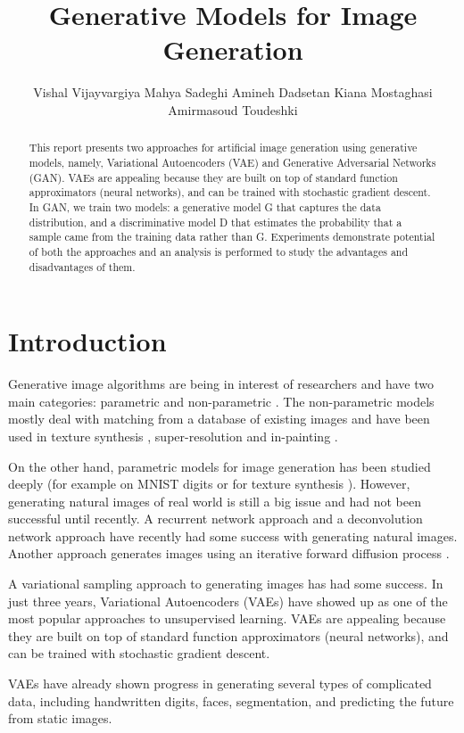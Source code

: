 \documentclass{article} %
\title{Generative Models for Image Generation}
\author{
Vishal Vijayvargiya
Mahya Sadeghi
Amineh Dadsetan
Kiana Mostaghasi
Amirmasoud Toudeshki
}
\begin{document}
\maketitle

\begin{abstract}
    This report presents two approaches for artificial image generation using generative models, namely, Variational Autoencoders (VAE) and Generative Adversarial Networks (GAN). VAEs are appealing because they are built on top of standard function approximators (neural networks), and can be trained with stochastic gradient descent. In GAN, we train two models: a generative model G that captures the data distribution, and a discriminative model D that estimates the probability that a sample came from the training data rather than G. Experiments demonstrate potential of both the approaches and an analysis is performed to study the advantages and disadvantages of them.
\end{abstract}
\section{Introduction}
Generative image algorithms are being in interest of researchers and have two main categories: parametric and non-parametric \cite{yek}. The non-parametric models mostly deal with matching from a database of existing images and have been used in texture synthesis \cite{do}, super-resolution  \cite{seh} and in-painting \cite{chahar}.

On the other hand, parametric models for image generation has been studied deeply (for example on MNIST digits or for texture synthesis \cite{panj}). However, generating natural images of real world  is still a big issue and had not been successful until recently. 
A recurrent network approach \cite{shish} and a deconvolution network approach \cite{haft}  have recently had some success with generating natural images. Another approach generates images using an iterative forward diffusion process \cite{hasht}.

A variational sampling approach to generating images \cite{noh} has had some success. In just three years, Variational Autoencoders (VAEs) have showed up as one of the most popular approaches to unsupervised learning. VAEs are appealing because they are built on top of standard function approximators (neural networks), and can be trained with stochastic gradient descent.                   

VAEs have already shown progress in generating several types of complicated data, including handwritten digits, faces, segmentation, and predicting the future from static images. 
\end{document}
